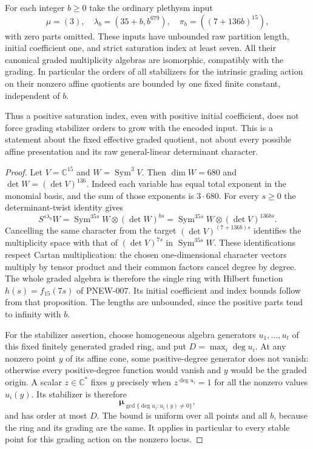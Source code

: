 \begin{proposition}
For each integer $b\ge0$ take the ordinary plethysm input
\[
 \mu=(3),\quad
 \lambda_b=(35+b,b^{679}),\quad
 \pi_b=((7+136b)^{15}),
 \tag{PNEW-twisted-positive}
\]
with zero parts omitted.  These inputs have unbounded raw
partition length, initial coefficient one, and strict saturation
index at least seven.  All their canonical graded multiplicity
algebras are isomorphic, compatibly with the grading.
In particular the orders of all stabilizers for the intrinsic
grading action on their nonzero affine quotients are bounded by
one fixed finite constant, independent of $b$.

Thus a positive saturation index, even with positive initial
coefficient, does not force grading stabilizer orders to grow
with the encoded input.  This is a statement about the fixed
effective graded quotient, not about every possible affine
presentation and its raw general-linear determinant character.
\end{proposition}
\begin{proof}
Let $V=\mathbb C^{15}$ and $W=\operatorname{Sym}^3V$.
Then $\dim W=680$ and $\det W=(\det V)^{136}$.
Indeed each variable has equal total exponent in the monomial
basis, and the sum of those exponents is $3\cdot680$.
For every $s\ge0$ the determinant-twist identity gives
\[
 S^{s\lambda_b}W
     =\operatorname{Sym}^{35s}W\otimes(\det W)^{bs}
     =\operatorname{Sym}^{35s}W\otimes(\det V)^{136bs}.
\]
Cancelling the same character from the target
$(\det V)^{(7+136b)s}$ identifies the multiplicity space
with that of $(\det V)^{7s}$ in $\operatorname{Sym}^{35s}W$.
These identifications respect Cartan multiplication: the chosen
one-dimensional character vectors multiply by tensor product
and their common factors cancel degree by degree.  The whole
graded algebra is therefore the single ring with Hilbert
function $h(s)=f_{15}(7s)$ of PNEW-007.  Its initial coefficient
and index bounds follow from that proposition.  The lengths
are unbounded, since the positive parts tend to infinity with $b$.

For the stabilizer assertion, choose homogeneous algebra
generators $u_1,\ldots,u_t$ of this fixed finitely generated
graded ring, and put $D=\max_i\deg u_i$.  At any nonzero
point $y$ of its affine cone, some positive-degree generator
does not vanish: otherwise every positive-degree function
would vanish and $y$ would be the graded origin.  A scalar
$z\in\mathbb C^*$ fixes $y$ precisely when
$z^{\deg u_i}=1$ for all the nonzero values $u_i(y)$.
Its stabilizer is therefore
\[
                  \boldsymbol\mu_{\gcd\{\deg u_i:u_i(y)\ne0\}},
\]
and has order at most $D$.  The bound is uniform over all
points and all $b$, because the ring and its grading are the
same.  It applies in particular to every stable point for
this grading action on the nonzero locus.
\end{proof}

